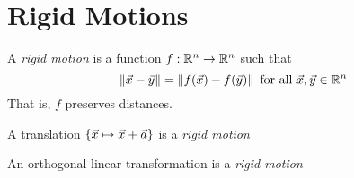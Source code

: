 \section{Rigid Motions}
\begin{definition}
  A \emph{rigid motion} is a function $f : \mathbb{R}^n \to \mathbb{R}^n$ such that
    $$\left\lVert\vec x - \vec y\right\rVert = \left\lVert f(\vec x) - f(\vec y)\right\rVert \text{ for all } \vec x, \vec y \in \mathbb{R}^n$$
  That is, $f$ preserves distances.
\end{definition}
\begin{defexample}
  A translation $\left\{ \vec x \mapsto \vec x + \vec a \right\}$ is a \emph{rigid motion}
\end{defexample}
\begin{defexample}
  An orthogonal linear transformation is a \emph{rigid motion}
\end{defexample}

